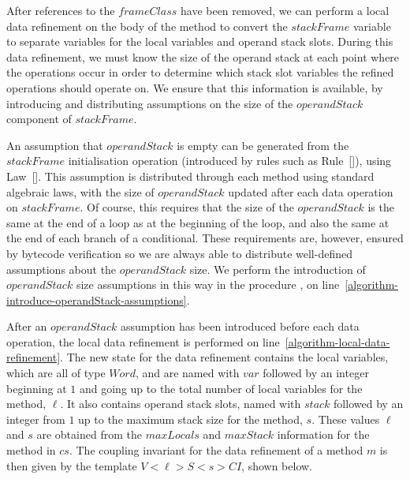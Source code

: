 After references to the $frameClass$ have been removed, we can perform
a local data refinement on the body of the method to convert the
$stackFrame$ variable to separate variables for the local variables
and operand stack slots.
During this data refinement, we must know the size of the operand
stack at each point where the operations occur in order to determine
which stack slot variables the refined operations should operate on.
We ensure that this information is available, by introducing and
distributing assumptions on the size of the $operandStack$ component
of $stackFrame$.

An assumption that $operandStack$ is empty can be generated from the
$stackFrame$ initialisation operation (introduced by rules such as
Rule~[]), using
Law~[].
This assumption is distributed through each method using standard
algebraic laws, with the size of $operandStack$ updated after each
data operation on $stackFrame$.
Of course, this requires that the size of the $operandStack$ is the
same at the end of a loop as at the beginning of the loop, and also
the same at the end of each branch of a conditional.
These requirements are, however, ensured by bytecode verification so
we are always able to distribute well-defined assumptions about the
$operandStack$ size.
We perform the introduction of $operandStack$ size assumptions in this
way in the procedure
, on
line~\ref{algorithm-introduce-operandStack-assumptions}.

After an $operandStack$ assumption has been introduced before each
data operation, the local data refinement is performed on
line~\ref{algorithm-local-data-refinement}.
The new state for the data refinement contains the local variables,
which are all of type $Word$, and are named with $var$ followed by an
integer beginning at $1$ and going up to the total number of local
variables for the method, $\ell$.
It also contains operand stack slots, named with $stack$ followed by
an integer from $1$ up to the maximum stack size for the method, $s$.
These values $\ell$ and $s$ are obtained from the $maxLocals$ and
$maxStack$ information for the  method in $cs$.
The coupling invariant for the data refinement of a method
$m$ is then given by the template $V{<}\ell{>}S{<}s{>}CI$, shown below.

